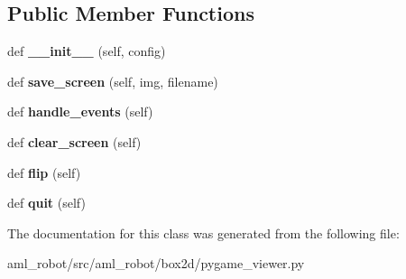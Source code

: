 \subsection*{Public Member Functions}
\begin{DoxyCompactItemize}
\item 
\hypertarget{classaml__robot_1_1box2d_1_1pygame__viewer_1_1_py_game_viewer_a530149972c036ef526ba6991116a47b2}{}\label{classaml__robot_1_1box2d_1_1pygame__viewer_1_1_py_game_viewer_a530149972c036ef526ba6991116a47b2} 
def {\bfseries \+\_\+\+\_\+init\+\_\+\+\_\+} (self, config)
\item 
\hypertarget{classaml__robot_1_1box2d_1_1pygame__viewer_1_1_py_game_viewer_af29ac357163b6817aaaa0f3ad60bc96e}{}\label{classaml__robot_1_1box2d_1_1pygame__viewer_1_1_py_game_viewer_af29ac357163b6817aaaa0f3ad60bc96e} 
def {\bfseries save\+\_\+screen} (self, img, filename)
\item 
\hypertarget{classaml__robot_1_1box2d_1_1pygame__viewer_1_1_py_game_viewer_aaa17bedd82fce8f72ff438b1bc32cbed}{}\label{classaml__robot_1_1box2d_1_1pygame__viewer_1_1_py_game_viewer_aaa17bedd82fce8f72ff438b1bc32cbed} 
def {\bfseries handle\+\_\+events} (self)
\item 
\hypertarget{classaml__robot_1_1box2d_1_1pygame__viewer_1_1_py_game_viewer_a054015487ce1c4dd49b53a22ee5e9698}{}\label{classaml__robot_1_1box2d_1_1pygame__viewer_1_1_py_game_viewer_a054015487ce1c4dd49b53a22ee5e9698} 
def {\bfseries clear\+\_\+screen} (self)
\item 
\hypertarget{classaml__robot_1_1box2d_1_1pygame__viewer_1_1_py_game_viewer_a18a725db8deaceeb8a2deb27319cd4c3}{}\label{classaml__robot_1_1box2d_1_1pygame__viewer_1_1_py_game_viewer_a18a725db8deaceeb8a2deb27319cd4c3} 
def {\bfseries flip} (self)
\item 
\hypertarget{classaml__robot_1_1box2d_1_1pygame__viewer_1_1_py_game_viewer_ab3e66ee1f73b5f7acfe64b93fff32195}{}\label{classaml__robot_1_1box2d_1_1pygame__viewer_1_1_py_game_viewer_ab3e66ee1f73b5f7acfe64b93fff32195} 
def {\bfseries quit} (self)
\end{DoxyCompactItemize}


The documentation for this class was generated from the following file\+:\begin{DoxyCompactItemize}
\item 
aml\+\_\+robot/src/aml\+\_\+robot/box2d/pygame\+\_\+viewer.\+py\end{DoxyCompactItemize}
